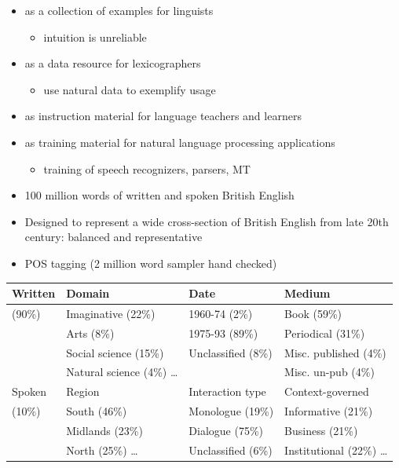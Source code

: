 \documentclass[a4paper,landscape,headrule,footrule,dvips]{foils}
\begin{document}
\begin{CJK}{UTF8}{min}
\begin{itemize}
\item as a collection of examples for linguists
  \begin{itemize}
  \item intuition is unreliable
  \end{itemize}
\item as a data resource for lexicographers
  \begin{itemize}
  \item use natural data to exemplify usage
  \end{itemize}
\item as instruction material for language teachers and learners
\item as training material for natural language processing applications
  \begin{itemize}
  \item training of speech recognizers, parsers, MT
  \end{itemize}
\end{itemize}



\begin{itemize}
\item 100 million words of written and spoken British English
\item Designed to represent a wide cross-section of British English from late 20th century: balanced and representative
\item POS tagging (2 million word sampler hand checked)
\end{itemize}
\begin{small}
  \begin{tabular}{l|lll}
    Written  & Domain  & Date & Medium \\ \hline
    (90\%)  & Imaginative (22\%) & 1960-74 (2\%) & Book (59\%) \\
    & Arts (8\%) & 1975-93 (89\%)  & Periodical (31\%)   \\
    & Social science (15\%)  & Unclassified (8\%)  & Misc. published (4\%) \\
    & Natural science (4\%) \ldots  & & Misc. un-pub (4\%)    \\  \hline
    Spoken  & Region  & Interaction type  & Context-governed \\ \hline
    (10\%)  &  South (46\%)  & Monologue (19\%)  & Informative (21\%) \\
    & Midlands (23\%)  & Dialogue (75\%)  & Business (21\%) \\
    & North (25\%)  \ldots & Unclassified (6\%)  & Institutional (22\%)  \ldots\\
  \end{tabular}
\end{small}



\end{CJK}
\end{document}
